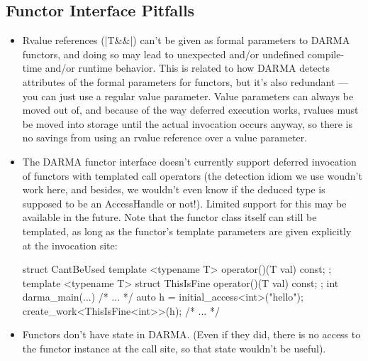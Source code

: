 \subsection{Functor Interface Pitfalls}

\begin{itemize}
  \item Rvalue references (|T&&|) can't be given as formal parameters to DARMA
  functors, and doing so may lead to unexpected and/or undefined compile-time
  and/or runtime behavior.  This is related to how DARMA detects attributes of
  the formal parameters for functors, but it's also redundant --- you can just
  use a regular value parameter.  Value parameters can always be moved out of,
  and because of the way deferred execution works, rvalues must be moved into
  storage until the actual invocation occurs anyway, so there is no savings
  from using an rvalue reference over a value parameter.
  \item The DARMA functor interface doesn't currently support deferred
  invocation of functors with templated call operators (the detection idiom we
  use woudn't work here, and besides, we wouldn't even know if the deduced type
  is supposed to be an AccessHandle or not!).  Limited support for this may be
  available in the future.  Note that the functor class itself can still be
  templated, as long as the functor's template parameters are given explicitly
  at the invocation site:
\begin{CppCodeNumb}
struct CantBeUsed {
  template <typename T>
  operator()(T val) const;
};
template <typename T>
struct ThisIsFine {
  operator()(T val) const;
};
int darma_main(...) {
  /* ... */
  auto h = initial_access<int>("hello");
  create_work<ThisIsFine<int>>(h);
  /* ... */
}
\end{CppCodeNumb}
  \item Functors don't have state in DARMA.  (Even if they did, there is no
  access to the functor instance at the call site, so that state wouldn't be useful).
\end{itemize}

\lstDeleteShortInline{\|}
